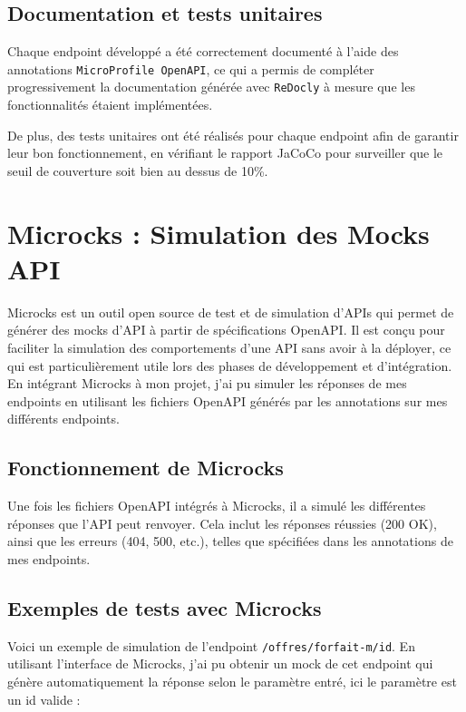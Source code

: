 \documentclass[11pt]{article}
\begin{document}
		
		\subsection*{Documentation et tests unitaires}
		
		Chaque endpoint développé a été correctement documenté à l'aide des annotations \texttt{MicroProfile OpenAPI}, ce qui a permis de compléter progressivement la documentation générée avec \texttt{ReDocly} à mesure que les fonctionnalités étaient implémentées.
		
		De plus, des tests unitaires ont été réalisés pour chaque endpoint afin de garantir leur bon fonctionnement, en vérifiant le rapport JaCoCo pour surveiller que le seuil de couverture soit bien au dessus de 10\%.
		
		\section{Microcks : Simulation des Mocks API}
		
	Microcks est un outil open source de test et de simulation d'APIs qui permet de générer des mocks d'API à partir de spécifications OpenAPI. Il est conçu pour faciliter la simulation des comportements d'une API sans avoir à la déployer, ce qui est particulièrement utile lors des phases de développement et d'intégration. En intégrant Microcks à mon projet, j'ai pu simuler les réponses de mes endpoints en utilisant les fichiers OpenAPI générés par les annotations sur mes différents endpoints.
		
		\subsection*{Fonctionnement de Microcks}
		
		Une fois les fichiers OpenAPI intégrés à Microcks, il a simulé les différentes réponses que l'API peut renvoyer. Cela inclut les réponses réussies (200 OK), ainsi que les erreurs (404, 500, etc.), telles que spécifiées dans les annotations de mes endpoints.
		
		\subsection*{Exemples de tests avec Microcks}
		
		Voici un exemple de simulation de l'endpoint \texttt{/offres/forfait-m/{id}}. En utilisant l'interface de Microcks, j'ai pu obtenir un mock de cet endpoint qui génère automatiquement la réponse selon le paramètre entré, ici le paramètre est un id valide : 
		
\end{document}
